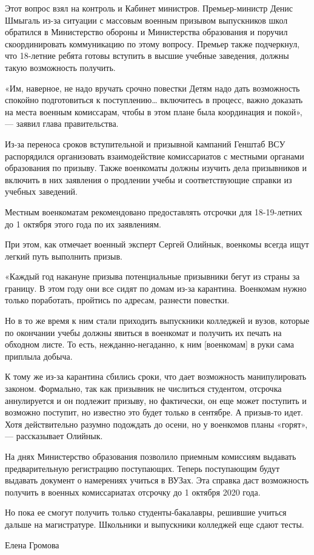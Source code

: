 Этот вопрос взял на контроль и Кабинет министров. Премьер-министр Денис Шмыгаль
из-за ситуации с массовым военным призывом выпускников школ обратился в
Министерство обороны и Министерства образования и поручил скоординировать
коммуникацию по этому вопросу. Премьер также подчеркнул, что 18-летние ребята
готовы вступить в высшие учебные заведения, должны такую возможность получить. 

«Им, наверное, не надо вручать срочно повестки Детям надо дать возможность
спокойно подготовиться к поступлению… включитесь в процесс, важно доказать на
места военным комиссарам, чтобы в этом плане была координация и покой», —
заявил глава правительства. 

Из-за переноса сроков вступительной и призывной кампаний Генштаб ВСУ
распорядился организовать взаимодействие комиссариатов с местными органами
образования по призыву. Также военкоматы должны изучить дела призывников и
включить в них заявления о продлении учебы и соответствующие справки из учебных
заведений. 

Местным военкоматам рекомендовано предоставлять отсрочки для 18-19-летних до 1
октября этого года по их заявлениям. 

При этом, как отмечает военный эксперт Сергей Олийнык, военкомы всегда ищут
легкий путь выполнить призыв. 

«Каждый год накануне призыва потенциальные призывники бегут из страны за
границу. В этом году они все сидят по домам из-за карантина. Военкомам нужно
только поработать, пройтись по адресам, разнести повестки. 

Но в то же время к ним стали приходить выпускники колледжей и вузов, которые по
окончании учебы должны явиться в военкомат и получить их печать на обходном
листе. То есть, нежданно-негаданно, к ним [военкомам] в руки сама приплыла
добыча. 

К тому же из-за карантина сбились сроки, что дает возможность манипулировать
законом. Формально, так как призывник не числиться студентом, отсрочка
аннулируется и он подлежит призыву, но фактически, он еще может поступить и
возможно поступит, но известно это будет только в сентябре. А призыв-то идет.
Хотя действительно разумно подождать до осени, но у военкомов планы «горят», —
рассказывает Олийнык. 

На днях Министерство образования позволило приемным комиссиям выдавать
предварительную регистрацию поступающих. Теперь поступающим будут выдавать
документ о намерениях учиться в ВУЗах. Эта справка даст возможность получить в
военных комиссариатах отсрочку до 1 октября 2020 года. 

Но пока ее смогут получить только студенты-бакалавры, решившие учиться дальше
на магистратуре. Школьники и выпускники колледжей еще сдают тесты.

Елена Громова
